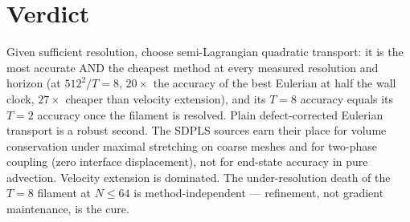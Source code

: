 \documentclass[preprint,3p,11pt]{elsarticle}
\begin{document}
\section{Verdict}
Given sufficient resolution, choose semi-Lagrangian quadratic transport: it
is the most accurate AND the cheapest method at every measured resolution
and horizon (at $512^2/T{=}8$, $20\times$ the accuracy of the best Eulerian
at half the wall clock, $27\times$ cheaper than velocity extension), and its
$T = 8$ accuracy equals its $T = 2$ accuracy once the filament is resolved.
Plain defect-corrected Eulerian transport is a robust second. The SDPLS
sources earn their place for volume conservation under maximal stretching on
coarse meshes and for two-phase coupling (zero interface displacement), not
for end-state accuracy in pure advection. Velocity extension is dominated.
The under-resolution death of the $T = 8$ filament at $N \le 64$ is
method-independent --- refinement, not gradient maintenance, is the cure.

\end{document}
